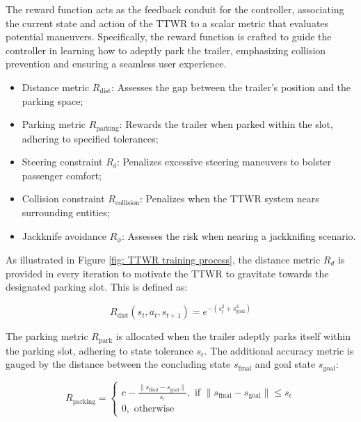 The reward function acts as the feedback conduit for the controller, associating the current state and action of the TTWR to a scalar metric that evaluates potential maneuvers. Specifically, the reward function is crafted to guide the controller in learning how to adeptly park the trailer, emphasizing collision prevention and ensuring a seamless user experience.

\begin{itemize}
  \item Distance metric $R_{\text{dist}}$: Assesses the gap between the trailer's position and the parking space;
  \item Parking metric $R_{\text{parking}}$: Rewards the trailer when parked within the slot, adhering to specified tolerances;
  \item Steering constraint $R_{\delta}$: Penalizes excessive steering maneuvers to bolster passenger comfort;
  \item Collision constraint $R_{\text{collision}}$: Penalizes when the TTWR system nears surrounding entities;
  \item Jackknife avoidance $R_{\phi}$: Assesses the risk when nearing a jackknifing scenario.
\end{itemize}

As illustrated in Figure \ref{fig: TTWR training process}, the distance metric $R_{d}$ is provided in every iteration to motivate the TTWR to gravitate towards the designated parking slot. This is defined as:

\begin{equation}
R_{\text{dist}}(s_t, a_t, s_{t+1}) = e^{-(s_t^2 + s_\text{goal}^2)}
\label{eq: distance reward}\end{equation}

The parking metric $R_{\text{park}}$ is allocated when the trailer adeptly parks itself within the parking slot, adhering to state tolerance $s_{\epsilon}$. The additional accuracy metric is gauged by the distance between the concluding state $s_{\text{final}}$ and goal state $s_{\text{goal}}$:

\begin{equation}
R_{\text{parking}}
=
\left\{\begin{array}{l}
c- \frac{ \lVert s_\text{final}-s_\text{goal} \rVert }{s_{\epsilon}}, \text { if } \lVert s_\text{final}-s_\text{goal} \rVert \leq s_{\epsilon}\\
0, \text { otherwise }
\end{array}\right.
\label{eq: parking reward}\end{equation}

